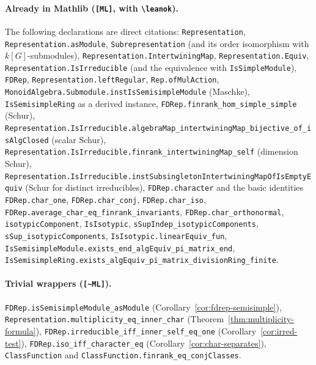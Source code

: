 \paragraph{Already in Mathlib (\texttt{[ML]}, with \texttt{\textbackslash leanok}).}
The following declarations are direct citations:
\texttt{Representation}, \texttt{Representation.asModule},
\texttt{Subrepresentation} (and its order isomorphism with $k[G]$-submodules),
\texttt{Representation.IntertwiningMap}, \texttt{Representation.Equiv},
\texttt{Representation.IsIrreducible} (and the equivalence with
\texttt{IsSimpleModule}), \texttt{FDRep},
\texttt{Representation.leftRegular}, \texttt{Rep.ofMulAction},
\texttt{MonoidAlgebra.Submodule.instIsSemisimpleModule} (Maschke),
\texttt{IsSemisimpleRing} as a derived instance,
\texttt{FDRep.finrank\_hom\_simple\_simple} (Schur),
\texttt{Representation.IsIrreducible.algebraMap\_intertwiningMap\_bijective\_of\_isAlgClosed}
(scalar Schur),
\texttt{Representation.IsIrreducible.finrank\_intertwiningMap\_self}
(dimension Schur),
\texttt{Representation.IsIrreducible.instSubsingletonIntertwiningMapOfIsEmptyEquiv}
(Schur for distinct irreducibles),
\texttt{FDRep.character} and the basic identities
\texttt{FDRep.char\_one}, \texttt{FDRep.char\_conj}, \texttt{FDRep.char\_iso},
\texttt{FDRep.average\_char\_eq\_finrank\_invariants},
\texttt{FDRep.char\_orthonormal},
\texttt{isotypicComponent}, \texttt{IsIsotypic},
\texttt{sSupIndep\_isotypicComponents}, \texttt{sSup\_isotypicComponents},
\texttt{IsIsotypic.linearEquiv\_fun},
\texttt{IsSemisimpleModule.exists\_end\_algEquiv\_pi\_matrix\_end},
\texttt{IsSemisimpleRing.exists\_algEquiv\_pi\_matrix\_divisionRing\_finite}.

\paragraph{Trivial wrappers (\texttt{[\textasciitilde ML]}).}
\texttt{FDRep.isSemisimpleModule\_asModule} (Corollary~\ref{cor:fdrep-semisimple}),
\texttt{Representation.multiplicity\_eq\_inner\_char}
(Theorem~\ref{thm:multiplicity-formula}),
\texttt{FDRep.irreducible\_iff\_inner\_self\_eq\_one}
(Corollary~\ref{cor:irred-test}),
\texttt{FDRep.iso\_iff\_character\_eq} (Corollary~\ref{cor:char-separates}),
\texttt{ClassFunction} and \texttt{ClassFunction.finrank\_eq\_conjClasses}.

